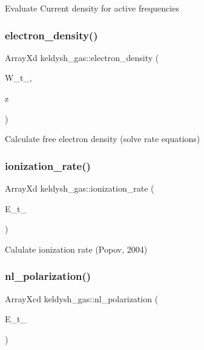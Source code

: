 Evaluate Current density for active frequencies \mbox{\label{classkeldysh__gas_a8dddacdfabea4d6c3049088cc868715a}} 
\subsubsection{\texorpdfstring{electron\+\_\+density()}{electron\_density()}}
{\footnotesize\ttfamily Array\+Xd keldysh\+\_\+gas\+::electron\+\_\+density (\begin{DoxyParamCaption}\item[{Array\+Xd}]{W\+\_\+t\+\_\+,  }\item[{double}]{z }\end{DoxyParamCaption})}

Calculate free electron density (solve rate equations) \mbox{\label{classkeldysh__gas_a42dc79816adcae9c25499baa7256ec10}} 
\subsubsection{\texorpdfstring{ionization\+\_\+rate()}{ionization\_rate()}}
{\footnotesize\ttfamily Array\+Xd keldysh\+\_\+gas\+::ionization\+\_\+rate (\begin{DoxyParamCaption}\item[{Array\+Xd}]{E\+\_\+t\+\_\+ }\end{DoxyParamCaption})}

Calulate ionization rate (Popov, 2004) \mbox{\label{classkeldysh__gas_a1cd65d1983cb6c5ff9d04eeb29e94dd5}} 
\subsubsection{\texorpdfstring{nl\+\_\+polarization()}{nl\_polarization()}}
{\footnotesize\ttfamily Array\+Xcd keldysh\+\_\+gas\+::nl\+\_\+polarization (\begin{DoxyParamCaption}\item[{Array\+Xd}]{E\+\_\+t\+\_\+ }\end{DoxyParamCaption})}

